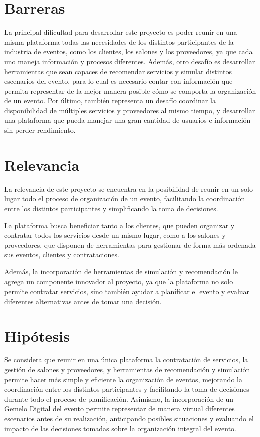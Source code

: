 \section{Barreras}

La principal dificultad para desarrollar este proyecto es poder reunir en
una misma plataforma todas las necesidades de los distintos participantes
de la industria de eventos, como los clientes, los salones y los
proveedores, ya que cada uno maneja información y procesos diferentes.
Además, otro desafío es desarrollar herramientas que sean
capaces de recomendar servicios y simular distintos escenarios del evento,
para lo cual es necesario contar con información que permita representar
de la mejor manera posible cómo se comporta la organización de un evento.
Por último, también representa un desafío coordinar la disponibilidad de
múltiples servicios y proveedores al mismo tiempo, y desarrollar una
plataforma que pueda manejar una gran cantidad de usuarios e información
sin perder rendimiento.

\section{Relevancia}

La relevancia de este proyecto se encuentra en la posibilidad de reunir en
un solo lugar todo el proceso de organización de un evento, facilitando la
coordinación entre los distintos participantes y simplificando la toma de
decisiones.

La plataforma busca beneficiar tanto a los clientes, que pueden organizar
y contratar todos los servicios desde un mismo lugar, como a los salones y
proveedores, que disponen de herramientas para gestionar de forma más
ordenada sus eventos, clientes y contrataciones.

Además, la incorporación de herramientas de simulación y recomendación le
agrega un componente innovador al proyecto, ya que la plataforma no solo
permite contratar servicios, sino también ayudar a planificar el evento y
evaluar diferentes alternativas antes de tomar una decisión.

\section{Hipótesis}

Se considera que reunir en una única plataforma la contratación de
servicios, la gestión de salones y proveedores, y herramientas de recomendación y simulación permite hacer más simple y
eficiente la organización de eventos, mejorando la coordinación entre los
distintos participantes y facilitando la toma de decisiones durante todo
el proceso de planificación. Asimismo, la incorporación de un Gemelo
Digital del evento permite representar de manera virtual diferentes
escenarios antes de su realización, anticipando posibles situaciones y
evaluando el impacto de las decisiones tomadas sobre la organización
integral del evento.

